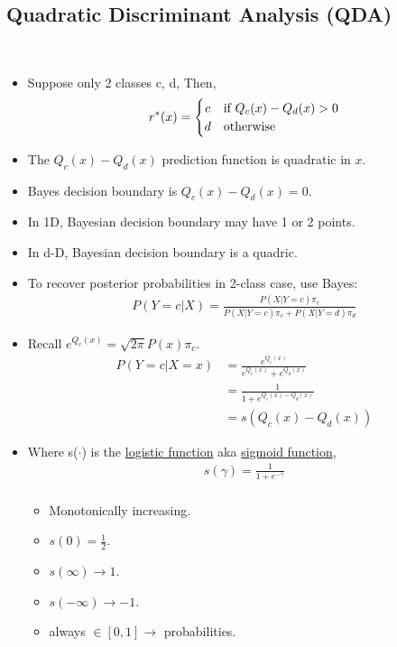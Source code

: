 \documentclass[10pt]{article}
\begin{document}
	\subsection*{Quadratic Discriminant Analysis (QDA)}
		\
		\begin{itemize}
			\item Suppose only 2 classes c, d, Then,
				\[
 				r^{*}(x) = \left\{\def\arraystretch{1.2}%
 					\begin{array}{@{}c@{\quad}l@{}}
    					c & \text{if $Q_{c}(x) - Q_{d}(x) > 0$}\\
   						d & \text{otherwise}\\
					\end{array}\right.
				\]
			\item The $Q_{c}(x) - Q_{d}(x)$ prediction function is quadratic in $x$.
			\item Bayes decision boundary is $Q_{c}(x) - Q_{d}(x) = 0$.
			\item In 1D, Bayesian decision boundary may have 1 or 2 points.
			\item In d-D, Bayesian decision boundary is a quadric. 
			\item To recover posterior probabilities in 2-class case, use Bayes:
				\begin{align*}
					P(Y=c|X) = \frac{P(X|Y=c)\pi_{c}}{P(X|Y=c)\pi_{c} + P(X|Y=d)\pi_{d}}
				\end{align*}
			\item Recall $e^{Q_{c}(x)} = \sqrt{2\pi}P(x)\pi_{c}$.
				\begin{align*}
					P(Y=c|X=x) &= \frac{e^{Q_{c}(x)}}{e^{Q_{c}(x)} + e^{Q_{d}(x)}}\\
					&= \frac{1}{1 + e^{Q_{c}(x) - Q_{d}(x)}}\\
					&= s(Q_{c}(x) - Q_{d}(x))
				\end{align*}
			\item Where s($\cdot$) is the \underline{logistic function} aka \underline{sigmoid function}, 
				\begin{align*}
					s(\gamma) = \frac{1}{1 + e^{-\gamma}}\\
				\end{align*}
				\begin{itemize}
					\item Monotonically increasing.\\
					\item $s(0) = \frac{1}{2}$.\\
					\item $s(\infty) \rightarrow 1$.\\
					\item $s(-\infty) \rightarrow -1$.\\
					\item always $\in [0, 1] \rightarrow$ probabilities.
				\end{itemize}
		\end{itemize}
		
\end{document}
